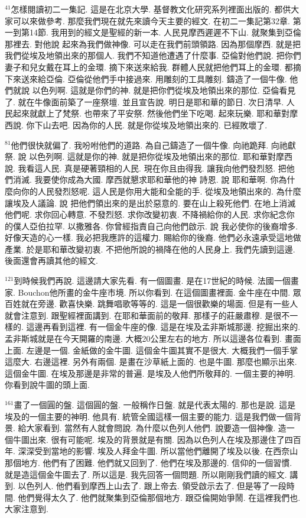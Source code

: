 \documentclass{book}
\begin{document}
$^{41}$怎樣閱讀初二一集記.
這是在北京大學.
基督教文化研究系列裡面出版的.
都供大家可以來做參考.
那麼我們現在就先來讀今天主要的經文.
在初二一集記第32章.
第一到第14節.
我用到的經文是聖經的新一本.
人民見摩西遲遲不下山.
就聚集到亞倫那裡去.
對他說 起來為我們做神像.
可以走在我們前頭領路.
因為那個摩西.
就是把我們從埃及地領出來的那個人.
我們不知道他遭遇了什麼事.
亞倫對他們說.
把你們妻子和兒女戴在耳上的金環.
摘下來送來給我.
群體人民就把他們耳上的金環.
都摘下來送來給亞倫.
亞倫從他們手中接過來.
用雕刻的工具雕刻.
鑄造了一個牛像.
他們就說 以色列啊.
這就是你們的神.
就是把你們從埃及地領出來的那位.
亞倫看見了.
就在牛像面前築了一座祭壇.
並且宣告說.
明日是耶和華的節日.
次日清早.
人民起來就獻上了梵祭.
也帶來了平安祭.
然後他們坐下吃喝.
起來玩樂.
耶和華對摩西說.
你下山去吧.
因為你的人民.
就是你從埃及地領出來的.
已經敗壞了.

$^{81}$他們很快就偏了.
我吩咐他們的道路.
為自己鑄造了一個牛像.
向祂跪拜.
向祂獻祭.
說 以色列啊.
這就是你的神.
就是把你從埃及地領出來的那位.
耶和華對摩西說.
我看這人民.
真是硬著頸相的人民.
現在你且由得我.
讓我向他們發烈怒.
把他們消滅.
我要使你成為大國.
摩西就懇求耶和華他的神 詩恩.
說 耶和華啊.
你為什麼向你的人民發烈怒呢.
這人民是你用大能和全能的手.
從埃及地領出來的.
為什麼讓埃及人議論.
說 把他們領出來的是出於惡意的.
要在山上殺死他們.
在地上消滅他們呢.
求你回心轉意.
不發烈怒.
求你改變初衷.
不降禍給你的人民.
求你紀念你的僕人亞伯拉罕.
以撒雅各.
你曾經指責自己向他們啟示.
說 我必使你的後裔增多.
好像天造的心一樣.
我必把我應許的這權力.
賜給你的後裔.
他們必永遠承受這地做產業.
於是耶和華改變初衷.
不把他所說的禍降在他的人民身上.
我們先讀到這邊.
後面還會再讀其他的經文.

$^{121}$到時候我們再說.
這邊請大家先看.
有一個圖畫.
是在17世紀的時候.
法國一個畫家.
Bouchon他所畫的金牛座市境.
所以你看到.
在這個圖畫裡面.
金牛座在中間.
眾百姓就在旁邊.
歡喜快樂.
跳舞唱歌等等的.
這是一個很歡樂的場面.
但是有一些人就會注意到.
跟聖經裡面講到.
在耶和華面前的敬拜.
那樣子的莊嚴肅穆.
是很不一樣的.
這邊再看到這裡.
有一個金牛座的像.
這是在埃及孟非斯城那邊.
挖掘出來的.
孟非斯城就是在今天開羅的南邊.
大概20公里左右的地方.
所以這邊各位看到.
畫面上面.
左邊是一個.
金紙做的金牛圖.
這個金牛圖其實不是很大.
大概我們一個手掌這麼大.
右邊這裡.
另外有兩個.
是畫在沙草紙上面的.
也是牛圖.
那麼也顯示出來.
這個金牛圖.
在埃及那邊是非常的普遍.
是埃及人他們所敬拜的.
一個主要的神明.
你看到說牛圖的頭上面.

$^{161}$畫了一個圓的盤.
這個圓的盤.
一般稱作日盤.
就是代表太陽的.
那也是說.
這是埃及的一個主要的神明.
他具有.
統管全國這樣一個主要的能力.
這是我們做一個背景.
給大家看到.
當然有人就會問說.
為什麼以色列人他們.
說要造一個神像.
造一個牛圖出來.
很有可能呢.
埃及的背景就是有關.
因為以色列人在埃及那邊住了四百年.
深深受到當地的影響.
埃及人拜金牛圖.
所以當他們離開了埃及以後.
在西奈山那個地方.
他們有了困難.
他們就又回到了.
他們在埃及那邊的.
信仰的一個習慣.
就是造這個金牛圖去了.
所以這是.
我先回答一個問題.
所以剛剛我們讀的經文.
講到.
以色列人.
他們看到摩西上山去了.
跟上帝去.
領受啟示去了.
但是等了一段時間.
他們覺得太久了.
他們就聚集到亞倫那個地方.
跟亞倫開始爭鬧.
在這裡我們也.
大家注意到.
\end{document}
